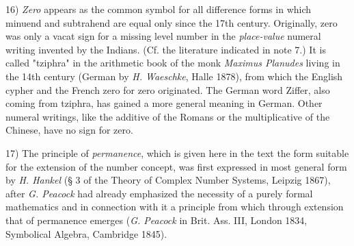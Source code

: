 \vfill
\leftline{\rule{2in}{0.4pt}}
\vspace{0.2cm}
{
\footnotesize
16) \textit{Zero} appears as the common symbol for all difference forms in which minuend and subtrahend are equal only since the 17th century. Originally, zero was only a vacat sign for a missing level number in the \textit{place-value} numeral writing invented by the Indians. (Cf. the literature indicated in note 7.) It is called "tziphra" in the arithmetic book of the monk \textit{Maximus Planudes} living in the 14th century (German by \textit{H. Waeschke}, Halle 1878), from which the English cypher and the French zero for zero originated. The German word Ziffer, also coming from tziphra, has gained a more general meaning in German. Other numeral writings, like the additive of the Romans or the multiplicative of the Chinese, have no sign for zero.

17) The principle of \textit{permanence}, which is given here in the text the form suitable for the extension of the number concept, was first expressed in most general form by \textit{H. Hankel} (§ 3 of the Theory of Complex Number Systems, Leipzig 1867), after \textit{G. Peacock} had already emphasized the necessity of a purely formal mathematics and in connection with it a principle from which through extension that of permanence emerges (\textit{G. Peacock} in Brit. Ass. III, London 1834, Symbolical Algebra, Cambridge 1845).

}
